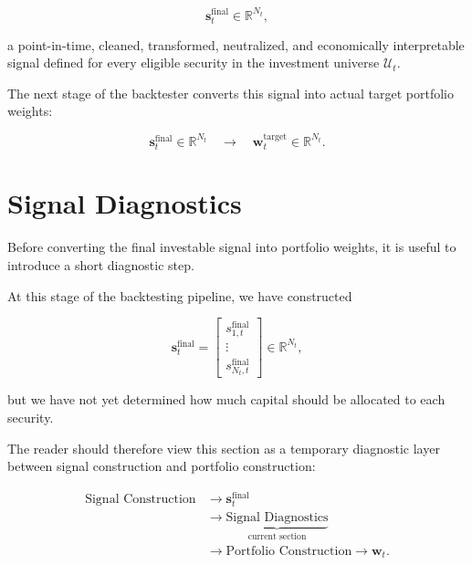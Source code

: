 \documentclass[11pt,a4paper]{article}
\begin{document}
\begin{equation}
\boxed{
\mathbf{s}_t^{\mathrm{final}}
\in
\mathbb{R}^{N_t},
}
\end{equation}

a point-in-time, cleaned, transformed, neutralized, and economically
interpretable signal defined for every eligible security in the investment
universe $\mathcal{U}_t$.

The next stage of the backtester converts this signal into actual target
portfolio weights:

\begin{equation}
\boxed{
\mathbf{s}_t^{\mathrm{final}}
\in
\mathbb{R}^{N_t}
\quad
\longrightarrow
\quad
\mathbf{w}_t^{\mathrm{target}}
\in
\mathbb{R}^{N_t}.
}
\end{equation}


\section{Signal Diagnostics}
\label{sec:signal_diagnostics}

Before converting the final investable signal into portfolio weights, it is
useful to introduce a short diagnostic step.

At this stage of the backtesting pipeline, we have constructed

\begin{equation}
\boxed{
\mathbf{s}_t^{\mathrm{final}}
=
\begin{bmatrix}
s_{1,t}^{\mathrm{final}}
\\
\vdots
\\
s_{N_t,t}^{\mathrm{final}}
\end{bmatrix}
\in
\mathbb{R}^{N_t},
}
\end{equation}

but we have not yet determined how much capital should be allocated to each
security.

The reader should therefore view this section as a temporary diagnostic layer
between signal construction and portfolio construction:

\begin{equation}
\boxed{
\begin{aligned}
\text{Signal Construction}
&\rightarrow
\mathbf{s}_t^{\mathrm{final}}
\\
&\rightarrow
\underbrace{
\text{Signal Diagnostics}
}_{\text{current section}}
\\
&\rightarrow
\text{Portfolio Construction}
\rightarrow
\mathbf{w}_t.
\end{aligned}
}
\end{equation}
\end{document}
